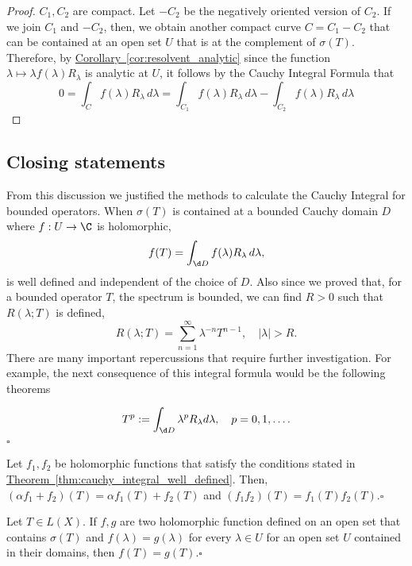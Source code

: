 \begin{proof}
    $C_1,C_2$ are compact. Let $-C_2$ be the negatively oriented version of $C_2$. If we join $C_1$ and $-C_2$, then, we obtain another compact curve $C = C_1-C_2$ that can be contained at an open set $U$ that is at the complement of $\sigma(T)$. Therefore, by \hyperref[cor:resolvent_analytic]{Corollary~\ref*{cor:resolvent_analytic}} since the function $\lambda \mapsto \lambda f(\lambda)R_\lambda$ is analytic at $U$, it follows by the Cauchy Integral Formula that
    \[ 0 = \int_{C} f(\lambda)R_\lambda\, d\lambda = \int_{C_1} f(\lambda)R_\lambda\, d\lambda - \int_{C_2} f(\lambda)R_\lambda\, d\lambda \]
\end{proof}

\subsection*{Closing statements}

From this discussion we justified the methods to calculate the Cauchy Integral for bounded operators. When $\sigma(T)$ is contained at a bounded Cauchy domain $D$ where $f: U \to \C$ is holomorphic,
\[ f(T) = \int_{\d D} f(\lambda) R_\lambda\, d\lambda, \]
is well defined and independent of the choice of $D$. Also since we proved that, for a bounded operator $T$, the spectrum is bounded, we can find $R > 0$ such that $R(\lambda; T)$ is defined,
\[ R(\lambda; T) = \sum_{n = 1}^{\infty} \lambda^{-n} T^{n-1},\quad |\lambda| > R. \]
There are many important repercussions that require further investigation. For example, the next consequence of this integral formula would be the following theorems

\begin{theorem}
    \[ T^p := \int_{\d D} \lambda^{p}R_\lambda d\lambda,\quad p = 0,1,\ldots. \]
    \hfill $\square$
\end{theorem}

\begin{theorem}
    Let $f_1,f_2$ be holomorphic functions that satisfy the conditions stated in \hyperref[thm:cauchy_integral_well_defined]{Theorem~\ref*{thm:cauchy_integral_well_defined}}. Then, $(\alpha f_1 + f_2)(T) = \alpha f_1(T) + f_2(T)$ and $(f_1f_2)(T) = f_1(T)f_2(T)$.\hfill $\square$
\end{theorem}

\begin{theorem}
    Let $T \in L(X)$. If $f,g$ are two holomorphic function defined on an open set that contains $\sigma(T)$ and $f(\lambda) = g(\lambda)$ for every $\lambda \in U$ for an open set $U$ contained in their domains, then $f(T) = g(T)$.\hfill $\square$
\end{theorem}

